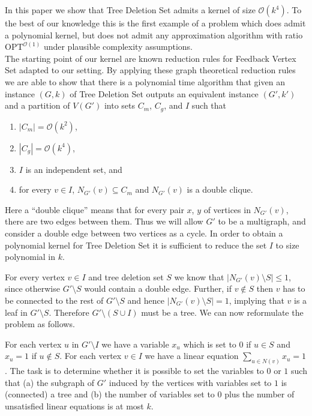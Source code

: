 \documentclass[a4paper,11pt]{article}
\newcommand{\Oh}{{\mathcal{O}}}
\begin{document}
In this paper we show that  {\sc Tree Deletion Set} admits a kernel of size $\Oh(k^4)$. To the best of our knowledge this is the first example of a problem which does admit a polynomial kernel, but does not admit any approximation algorithm with ratio $\text{OPT}^{\Oh(1)}$ under plausible complexity assumptions.\\

The starting point of our kernel are known reduction rules for {\sc Feedback Vertex Set} adapted to our setting. By applying these graph theoretical reduction rules we are able to show that there is a polynomial time algorithm that given 
an instance $(G,k)$ of {\sc Tree Deletion Set} outputs an equivalent instance $(G',k')$ and a partition of $V(G')$ into sets $C_{m}$, $C_{g}$, and $I$ such that 
\begin{enumerate}\setlength\itemsep{-.7mm}
\item\label{introlem:clse1} $|C_{m}|= \Oh(k^{2})$, 
\item\label{introlem:clse2} $|C_{g}|= \Oh(k^{4})$, 
\item\label{introlem:clse3} $I$ is an independent set, and 
\item\label{introlem:clse4} for every $v\in I$, $N_{G'}(v)\subseteq C_{m}$ and $N_{G'}(v)$ is a double clique.
\end{enumerate}

\noindent Here a ``double clique'' means that for every pair $x$, $y$ of vertices in $N_{G'}(v)$, there are two edges between them. Thus we will allow $G'$ to be a multigraph, and consider a double edge between two vertices as a cycle. In order to obtain a polynomial kernel for {\sc Tree Deletion Set} it is sufficient to reduce the set $I$ to size polynomial in $k$.

For every vertex $v \in I$ and tree deletion set $S$ we know that $|N_{G'}(v) \setminus S| \leq 1$, since otherwise $G' \setminus S$ would contain a double edge. Further, if $v \notin S$ then $v$ has to be connected to the rest of 
$G' \setminus S$ and hence  $|N_{G'}(v) \setminus S| = 1$, implying that $v$ is a leaf in $G' \setminus S$. Therefore $G' \setminus (S \cup I)$ must be a tree. We can now reformulate the problem as follows.

For each vertex $u$ in $G' \setminus I$ we have a variable $x_u$ which is set to $0$ if $u \in S$ and $x_u = 1$ if $u \notin S$. For each vertex $v \in I$ we have a linear equation $\sum_{u \in N(v)} x_u = 1$. The task is to determine whether it is possible to set the variables to $0$ or $1$ such that (a) the subgraph of $G'$ induced by the vertices with variables set to $1$ is (connected) a  tree   and (b) the number of variables set to $0$ plus the number of unsatisfied linear equations is at most $k$.
\end{document}
